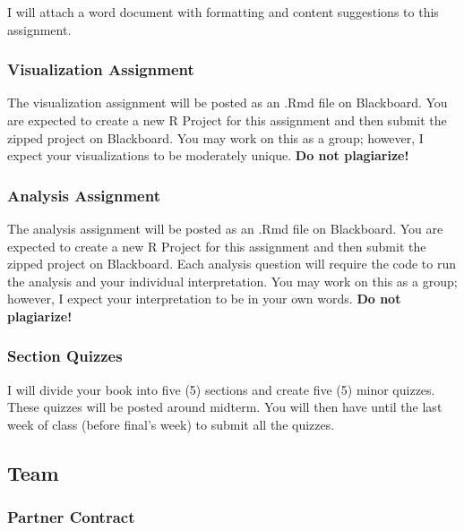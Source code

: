 \documentclass[
  b5paper]{book}
\begin{document}
I will attach a word document with formatting and content suggestions to this assignment.

\hypertarget{visualization-assignment}{%
\subsubsection*{Visualization Assignment}\label{visualization-assignment}}

The visualization assignment will be posted as an .Rmd file on Blackboard. You are expected to create a new R Project for this assignment and then submit the zipped project on Blackboard. You may work on this as a group; however, I expect your visualizations to be moderately unique. \textbf{Do not plagiarize!}

\hypertarget{analysis-assignment}{%
\subsubsection*{Analysis Assignment}\label{analysis-assignment}}

The analysis assignment will be posted as an .Rmd file on Blackboard. You are expected to create a new R Project for this assignment and then submit the zipped project on Blackboard. Each analysis question will require the code to run the analysis and your individual interpretation. You may work on this as a group; however, I expect your interpretation to be in your own words. \textbf{Do not plagiarize!}

\hypertarget{section-quizzes}{%
\subsubsection*{Section Quizzes}\label{section-quizzes}}

I will divide your book into five (5) sections and create five (5) minor quizzes. These quizzes will be posted around midterm. You will then have until the last week of class (before final's week) to submit all the quizzes.

\hypertarget{team}{%
\subsection*{Team}\label{team}}

\hypertarget{partner-contract}{%
\subsubsection*{Partner Contract}\label{partner-contract}}
\end{document}

